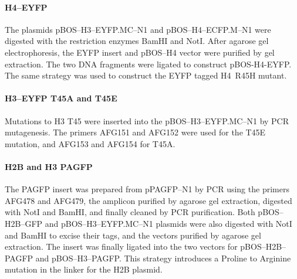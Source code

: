     \paragraph{H4--EYFP}
      The plasmids pBOS--H3--EYFP.MC--N1 and pBOS--H4--ECFP.M--N1 were
      digested with the restriction enzymes BamHI and NotI. After agarose
      gel electrophoresis, the EYFP insert and pBOS--H4 vector were purified
      by gel extraction. The two DNA fragments were ligated to construct
      pBOS-H4-EYFP. The same strategy was used to construct the EYFP tagged
      H4~R45H mutant.

    \paragraph{H3--EYFP T45A and T45E}
      Mutations to H3 T45 were inserted into the pBOS--H3--EYFP.MC--N1 by
      PCR mutagenesis. The primers AFG151 and AFG152 were used for the
      T45E mutation, and AFG153 and AFG154 for T45A.

    \paragraph{H2B and H3 PAGFP}
      The PAGFP insert was prepared from pPAGFP--N1 by PCR using the
      primers AFG478 and AFG479, the amplicon purified by agarose gel
      extraction, digested with NotI and BamHI, and finally cleaned by
      PCR purification.
      Both pBOS--H2B--GFP and pBOS--H3--EYFP.MC--N1 plasmids were also
      digested with NotI and BamHI to excise their tags, and the vectors
      purified by agarose gel extraction. The insert was finally ligated
      into the two vectors for pBOS--H2B--PAGFP and pBOS--H3--PAGFP.
      This strategy introduces a Proline to Arginine mutation in the
      linker for the H2B plasmid.

